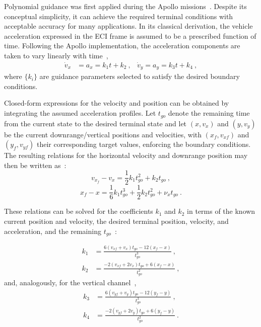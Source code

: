 Polynomial guidance was first applied during the Apollo missions~\cite{bennett1970lunar}. Despite its conceptual simplicity, it can achieve the required terminal conditions with acceptable accuracy for many applications. In its classical derivation, the vehicle acceleration expressed in the ECI frame is assumed to be a prescribed function of time. Following the Apollo implementation, the acceleration components are taken to vary linearly with time~\cite{Mooij_lunar_ascent},
\begin{equation}
\begin{aligned}
\dot{v}_x &= a_x = k_1 t + k_2 \ , &
\dot{v}_y = a_y = k_3 t + k_4 \ ,
\end{aligned}
\end{equation}
where $\{k_i\}$ are guidance parameters selected to satisfy the desired boundary conditions. 

Closed-form expressions for the velocity and position can be obtained by integrating the assumed acceleration profiles. Let $t_{go}$ denote the remaining time from the current state to the desired terminal state and let $(x,v_x)$ and $(y,v_y)$ be the current downrange/vertical positions and velocities,
with $(x_f,v_{xf})$ and $(y_f,v_{yf})$ their corresponding target values, enforcing the boundary conditions. The resulting relations for the horizontal velocity and downrange position may then be written as~\cite{sostaric2005powered}:
\begin{equation}
v_{x_f}-v_x = \frac{1}{2}k_1 t_{go}^2 + k_2 t_{go} \ ,
\end{equation}
\begin{equation}
x_f-x = \frac{1}{6}k_1 t_{go}^3 + \frac{1}{2}k_2 t_{go}^2 + \nu_x t_{go} \ .
\end{equation}

These relations can be solved for the coefficients $k_1$ and $k_2$ in terms of the known current position and velocity, the desired terminal position, velocity, and acceleration, and the remaining $t_{go}$~\cite{Mooij_lunar_ascent}:

\begin{equation}
\begin{aligned}
k_1 &= \frac{6\left(v_{xf}+v_x\right)t_{go}-12\left(x_f-x\right)}{t_{go}^3} \ ,\\[4pt]
k_2 &= \frac{-2\left(v_{xf}+2v_x\right)t_{go}+6\left(x_f-x\right)}{t_{go}^2} \ ,
\end{aligned}
\end{equation}
and, analogously, for the vertical channel~\cite{Mooij_lunar_ascent},
\begin{equation}
\begin{aligned}
k_3 &= \frac{6\left(v_{yf}+v_y\right)t_{go}-12\left(y_f-y\right)}{t_{go}^3} \ ,\\[4pt]
k_4 &= \frac{-2\left(v_{yf}+2v_y\right)t_{go}+6\left(y_f-y\right)}{t_{go}^2} \ .
\end{aligned}
\end{equation}

